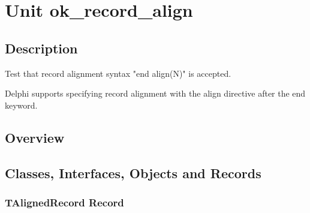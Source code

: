 \documentclass{report}
\newif\ifpdf
\begin{document}
\label{toc}\tableofcontents
\newpage
\newlength{\tmplength}
\chapter{Unit ok{\_}record{\_}align}
\label{ok_record_align}
\section{Description}
Test that record alignment syntax "end align(N)" is accepted.\hfill\vspace*{1ex}

 Delphi supports specifying record alignment with the align directive after the end keyword.
\section{Overview}
\begin{description}
\item[\texttt{\begin{ttfamily}TAlignedRecord\end{ttfamily} Record}]
\item[\texttt{\begin{ttfamily}TAnotherAligned\end{ttfamily} Record}]
\end{description}
\section{Classes, Interfaces, Objects and Records}
\ifpdf
\subsection*{\large{\textbf{TAlignedRecord Record}}\normalsize\hspace{1ex}\hrulefill}
\else
\subsection*{TAlignedRecord Record}
\fi
\label{ok_record_align.TAlignedRecord}
\end{document}
